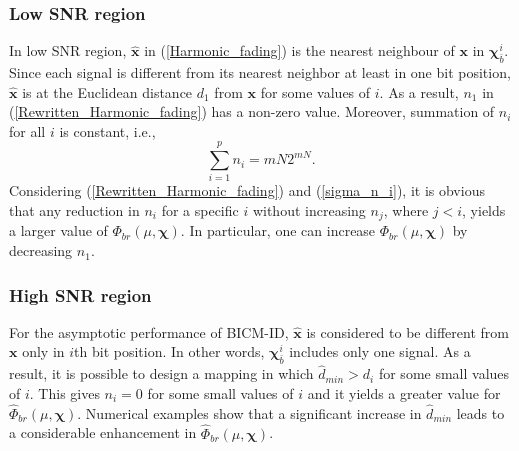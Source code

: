 \documentclass[12pt, draftclsnofoot, onecolumn]{IEEEtran}
\newcommand{\mb}[1]{\boldsymbol{#1}}
\begin{document}
\subsubsection{Low SNR region}  In  low SNR region,   $\hat{\mb{x}}$ in (\ref{Harmonic_fading}) is the nearest neighbour of $\mb{x}$ in $\mb{\chi}_{\bar b}^{i}$. Since each signal is different from its nearest neighbor at least in one bit position,  $\hat{\mb{x}}$ is at the Euclidean distance $d_{1}$ from $\mb{x}$ for some values of $i$. As a result, $n_{1}$ in (\ref{Rewritten_Harmonic_fading}) has a non-zero value. Moreover, summation of $n_{i}$ for all  $i$ is  constant,   i.e., 
\begin{equation}
\sum_{i = 1}^{p} n_{i}=mN2^{mN}.
\label{sigma_n_i}
\end{equation} 
Considering (\ref{Rewritten_Harmonic_fading}) and (\ref{sigma_n_i}), it is obvious that  any reduction in $n_{i}$ for a specific $i$ without increasing $n_{j}$, where $j<i$, yields a larger value of  $\Phi_{br}(\mu,\mb{\chi})$.
In particular, one can  increase  $\Phi_{br}(\mu,\mb{\chi})$ by  decreasing  $n_1$. %


\subsubsection{High SNR region}
For the asymptotic performance of BICM-ID, $\hat{\mb{x}}$ is considered to be  different from $\mb{x}$ only in $i$th bit position. In other words,   $\mb{\chi}_{\bar b}^{i}$ includes only one signal. %
\color{black} As a result, it is possible to design a mapping in which $\hat{d}_{min}>d_{i}$ for some small values of $i$. This gives  $n_{i}=0$ for some small values of $i$ and it  yields a greater value for  $\hat{\Phi}_{br}(\mu,\mb{\chi})$\color{black}. Numerical examples \color{black} show that a significant increase in $\hat{d}_{min}$ leads to a considerable enhancement in $\hat{\Phi}_{br}(\mu,\mb{\chi})$.  

\end{document}
